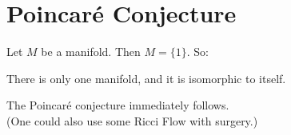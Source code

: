 \setcounter{section}{0}

\section{Poincar\'{e} Conjecture}
Let $M$ be a manifold. Then 
$M = \{1\}$. So:
\begin{thm}
  There is only one manifold, 
  and it is isomorphic to itself.
\end{thm}
\vspace{-0.1cm}
The Poincar\'{e} conjecture 
immediately follows.\\

(One could also use some Ricci Flow with surgery.)

